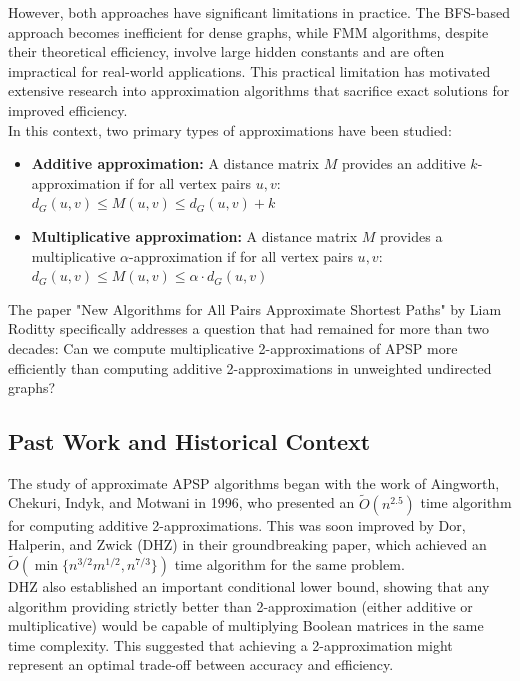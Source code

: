 \documentclass[a4paper,11pt,oneside]{book}
\begin{document}
However, both approaches have significant limitations in practice. The BFS-based approach becomes inefficient for dense graphs, while FMM algorithms, despite their theoretical efficiency, involve large hidden constants and are often impractical for real-world applications. This practical limitation has motivated extensive research into approximation algorithms that sacrifice exact solutions for improved efficiency.\\

In this context, two primary types of approximations have been studied:
\begin{itemize}
    \item \textbf{Additive approximation:} A distance matrix $M$ provides an additive $k$-approximation if for all vertex pairs $u,v$: $d_G(u,v) \leq M(u,v) \leq d_G(u,v) + k$
    \item \textbf{Multiplicative approximation:} A distance matrix $M$ provides a multiplicative $\alpha$-approximation if for all vertex pairs $u,v$: $d_G(u,v) \leq M(u,v) \leq \alpha \cdot d_G(u,v)$
\end{itemize}

The paper "New Algorithms for All Pairs Approximate Shortest Paths" by Liam Roditty specifically addresses a question that had remained for more than two decades: Can we compute multiplicative 2-approximations of APSP more efficiently than computing additive 2-approximations in unweighted undirected graphs?\\

\subsection{Past Work and Historical Context}
The study of approximate APSP algorithms began with the work of Aingworth, Chekuri, Indyk, and Motwani in 1996, who presented an $\tilde{O}(n^{2.5})$ time algorithm for computing additive 2-approximations. This was soon improved by Dor, Halperin, and Zwick (DHZ) in their groundbreaking paper, which achieved an $\tilde{O}(\min\{n^{3/2}m^{1/2}, n^{7/3}\})$ time algorithm for the same problem.\\

DHZ also established an important conditional lower bound, showing that any algorithm providing strictly better than 2-approximation (either additive or multiplicative) would be capable of multiplying Boolean matrices in the same time complexity. This suggested that achieving a 2-approximation might represent an optimal trade-off between accuracy and efficiency.\\
\end{document}
